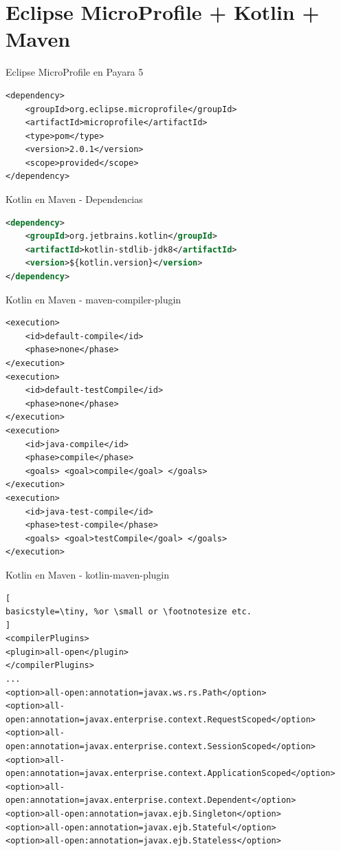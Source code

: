 \documentclass{beamer}
\begin{document}
\section{Eclipse MicroProfile + Kotlin + Maven}

\begin{frame}[fragile]{Eclipse MicroProfile en Payara 5}
\begin{lstlisting}
<dependency>
	<groupId>org.eclipse.microprofile</groupId>
	<artifactId>microprofile</artifactId>
	<type>pom</type>
	<version>2.0.1</version>
	<scope>provided</scope>
</dependency>
\end{lstlisting}
\end{frame}


\begin{frame}[fragile]{Kotlin en Maven - Dependencias}
\begin{lstlisting}[language=XML]
<dependency>
	<groupId>org.jetbrains.kotlin</groupId>
	<artifactId>kotlin-stdlib-jdk8</artifactId>
	<version>${kotlin.version}</version>
</dependency>
\end{lstlisting}
\end{frame}

\begin{frame}[fragile]{Kotlin en Maven - maven-compiler-plugin}
\begin{lstlisting}
<execution>
	<id>default-compile</id>
	<phase>none</phase>
</execution>
<execution>
	<id>default-testCompile</id>
	<phase>none</phase>
</execution>
<execution>
	<id>java-compile</id>
	<phase>compile</phase>
	<goals> <goal>compile</goal> </goals>
</execution>
<execution>
	<id>java-test-compile</id>
	<phase>test-compile</phase>
	<goals> <goal>testCompile</goal> </goals>
</execution>
\end{lstlisting}
\end{frame}


\begin{frame}[fragile]{Kotlin en Maven - kotlin-maven-plugin}
\begin{lstlisting}[
basicstyle=\tiny, %or \small or \footnotesize etc.
]
<compilerPlugins>
<plugin>all-open</plugin>
</compilerPlugins>
...
<option>all-open:annotation=javax.ws.rs.Path</option>
<option>all-open:annotation=javax.enterprise.context.RequestScoped</option>
<option>all-open:annotation=javax.enterprise.context.SessionScoped</option>
<option>all-open:annotation=javax.enterprise.context.ApplicationScoped</option>
<option>all-open:annotation=javax.enterprise.context.Dependent</option>
<option>all-open:annotation=javax.ejb.Singleton</option>
<option>all-open:annotation=javax.ejb.Stateful</option>
<option>all-open:annotation=javax.ejb.Stateless</option>
\end{lstlisting}
\end{frame}
\end{document}

